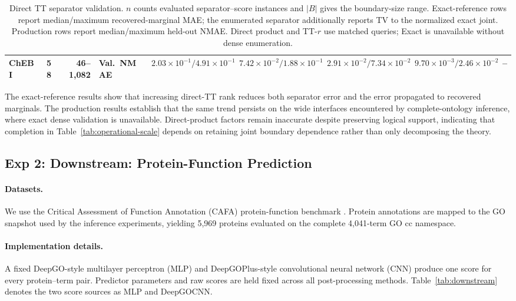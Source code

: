 \documentclass[letterpaper]{article}
\begin{document}
\begin{table}[t]
{\begin{tabular}{lrrlrrrrr}
ChEBI
& 58
& 46--1,082
& Val.\ NMAE
& \(2.03{\times}10^{-1}/4.91{\times}10^{-1}\)
& \(7.42{\times}10^{-2}/1.88{\times}10^{-1}\)
& \(2.91{\times}10^{-2}/7.34{\times}10^{-2}\)
& \(9.70{\times}10^{-3}/2.46{\times}10^{-2}\)
& -- \\

\bottomrule
\end{tabular}
}
\caption{
Direct TT separator validation. \(n\) counts evaluated separator--score
instances and \(|B|\) gives the boundary-size range. Exact-reference rows
report median/maximum recovered-marginal MAE; the enumerated separator
additionally reports TV to the normalized exact joint. Production rows
report median/maximum held-out NMAE. Direct product and TT-\(r\) use
matched queries; Exact is unavailable without dense enumeration.
}
\label{tab:direct-tt}
\end{table}

The exact-reference results show that increasing direct-TT rank
reduces both separator error and the error propagated to recovered
marginals. The production results establish that the same trend
persists on the wide interfaces encountered by complete-ontology
inference, where exact dense validation is unavailable. Direct-product
factors remain inaccurate despite preserving logical support,
indicating that completion in Table~\ref{tab:operational-scale}
depends on retaining joint boundary dependence rather than only
decomposing the theory.

\subsection{Exp 2: Downstream: Protein-Function Prediction}

\paragraph{Datasets.}
We use the Critical Assessment of Function Annotation (CAFA)
protein-function benchmark
\citep{radivojac2013cafa,zhou2019cafa3}.
Protein annotations are mapped to the GO snapshot used by the
inference experiments, yielding 5,969 proteins evaluated on the
complete 4,041-term GO cc namespace.

\paragraph{Implementation details.}
A fixed DeepGO-style multilayer perceptron (MLP) and
DeepGOPlus-style convolutional neural network (CNN)
\citep{kulmanov2018deepgo,kulmanov2020deepgoplus}
produce one score for every protein--term pair. Predictor parameters
and raw scores are held fixed across all post-processing methods.
Table~\ref{tab:downstream} denotes the two score sources as MLP and
DeepGOCNN.
\end{document}
